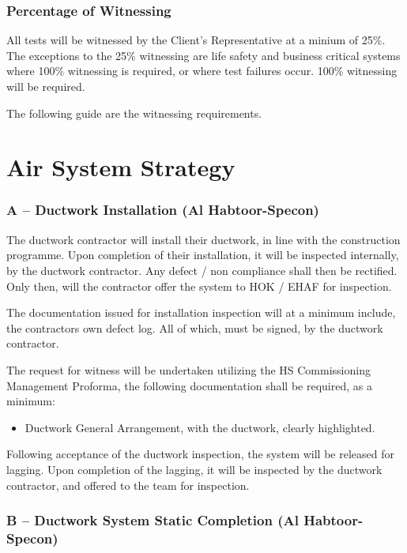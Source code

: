 \subsection{Percentage of Witnessing}

All tests will be witnessed by the Client's Representative at a minium of 25\%.
The exceptions to the 25\% witnessing are life safety and business critical systems where 100\% witnessing is required, or where test failures occur. 100\% witnessing will be required.

The following guide are the witnessing requirements.



\chapter{Air System Strategy}

\subsection*{A – Ductwork Installation (Al Habtoor-Specon)}

The ductwork contractor will install their ductwork, in line with the construction programme. Upon completion of their installation, it will be inspected internally, by the ductwork contractor. Any defect / non compliance shall then be rectified. Only then, will the contractor offer the system to HOK / EHAF for inspection.

The documentation issued for installation inspection will at a minimum include, the contractors own defect log. All of which, must be signed, by the ductwork contractor.

The request for witness will be undertaken utilizing the HS Commissioning Management Proforma, the following documentation shall be required, as a minimum:

\begin{itemize}

\item 	Ductwork General Arrangement, with the ductwork, clearly highlighted.

\end{itemize}

Following acceptance of the ductwork inspection, the system will be released for lagging. Upon completion of the lagging, it will be inspected by the ductwork contractor, and offered to the team for inspection.

\subsection{B – Ductwork System Static Completion (Al Habtoor-Specon)}

